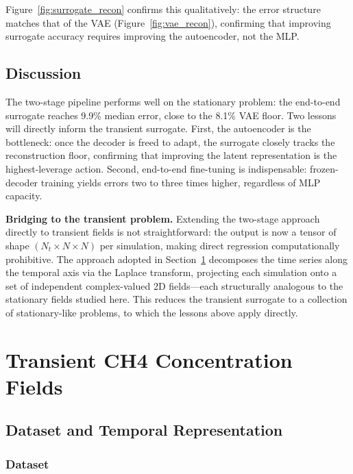 \documentclass[a4paper]{article}
\begin{document}
Figure~\ref{fig:surrogate_recon} confirms this qualitatively: the error structure matches that of the VAE (Figure~\ref{fig:vae_recon}), confirming that improving surrogate accuracy requires improving the autoencoder, not the MLP.

\subsection{Discussion}

The two-stage pipeline performs well on the stationary problem: the end-to-end surrogate reaches 9.9\% median error, close to the 8.1\% VAE floor. Two lessons will directly inform the transient surrogate. First, the autoencoder is the bottleneck: once the decoder is freed to adapt, the surrogate closely tracks the reconstruction floor, confirming that improving the latent representation is the highest-leverage action. Second, end-to-end fine-tuning is indispensable: frozen-decoder training yields errors two to three times higher, regardless of MLP capacity.

\textbf{Bridging to the transient problem.} Extending the two-stage approach directly to transient fields is not straightforward: the output is now a tensor of shape $(N_t \times N \times N)$ per simulation, making direct regression computationally prohibitive. The approach adopted in Section~\ref{sec:transient} decomposes the time series along the temporal axis via the Laplace transform, projecting each simulation onto a set of independent complex-valued 2D fields—each structurally analogous to the stationary fields studied here. This reduces the transient surrogate to a collection of stationary-like problems, to which the lessons above apply directly.

\newpage
\section{Transient CH4 Concentration Fields}
\label{sec:transient}

\subsection{Dataset and Temporal Representation}

\subsubsection{Dataset}
\end{document}
